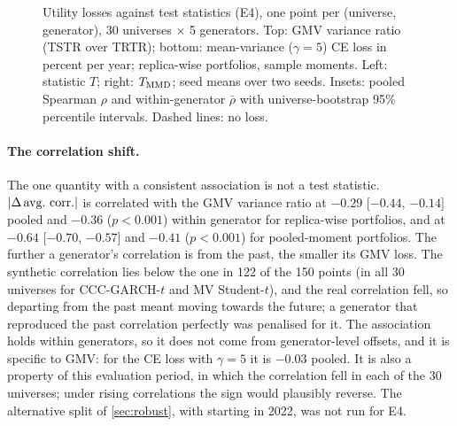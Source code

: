 \begin{figure}[tbp]
  \centering
  \caption{Utility losses against test statistics (E4), one point per (universe, generator), 30
  universes $\times$ 5 generators. Top: GMV variance ratio (TSTR over TRTR); bottom: mean-variance
  ($\gamma=5$) CE loss in percent per year; replica-wise portfolios, sample moments. Left: \WC{}
  statistic $T$; right: $T_{\mathrm{MMD}}$; seed means over two seeds. Insets: pooled Spearman $\rho$ and
  within-generator $\bar\rho$ with universe-bootstrap 95\% percentile intervals. Dashed lines: no
  loss.}
  \label{fig:e4-utility-vs-distance}
\end{figure}

\paragraph{The correlation shift.}
The one quantity with a consistent association is not a test statistic.
$\abs{\Delta\,\text{avg.\ corr.}}$ is correlated with the GMV variance ratio at $-0.29$ [$-0.44$,
$-0.14$] pooled and $-0.36$ ($p<0.001$) within generator for replica-wise portfolios, and at
$-0.64$ [$-0.70$, $-0.57$] and $-0.41$ ($p<0.001$) for pooled-moment portfolios. The further a
generator's correlation is from the past, the smaller its GMV loss. The synthetic correlation lies
below the \TRAIN{} one in 122 of the 150 points (in all 30 universes for CCC-GARCH-$t$ and MV
Student-$t$), and the real correlation fell, so departing from the past meant moving towards the
future; a generator that reproduced the past correlation perfectly was penalised for it. The
association holds within generators, so it does not come from generator-level offsets, and it is
specific to GMV: for the CE loss with $\gamma=5$ it is $-0.03$ pooled. It is also a property of
this evaluation period, in which the correlation fell in each of the 30 universes; under rising
correlations the sign would plausibly reverse. The alternative split of \cref{sec:robust}, with
\TEST{} starting in 2022, was not run for E4.

